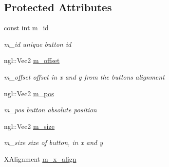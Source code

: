 \subsection*{Protected Attributes}
\begin{DoxyCompactItemize}
\item 
\hypertarget{class_button_a8d446cc1bff0dad800e74e151eaeaf38}{}const int \hyperlink{class_button_a8d446cc1bff0dad800e74e151eaeaf38}{m\+\_\+id}\label{class_button_a8d446cc1bff0dad800e74e151eaeaf38}

\begin{DoxyCompactList}\small\item\em m\+\_\+id unique button id \end{DoxyCompactList}\item 
\hypertarget{class_button_a20ef475ad8fec530edf763d329984a23}{}ngl\+::\+Vec2 \hyperlink{class_button_a20ef475ad8fec530edf763d329984a23}{m\+\_\+offset}\label{class_button_a20ef475ad8fec530edf763d329984a23}

\begin{DoxyCompactList}\small\item\em m\+\_\+offset offset in x and y from the button\textquotesingle{}s alignment \end{DoxyCompactList}\item 
\hypertarget{class_button_a69d3cbc6e82f975ed030b3e375c6c24c}{}ngl\+::\+Vec2 \hyperlink{class_button_a69d3cbc6e82f975ed030b3e375c6c24c}{m\+\_\+pos}\label{class_button_a69d3cbc6e82f975ed030b3e375c6c24c}

\begin{DoxyCompactList}\small\item\em m\+\_\+pos button absolute position \end{DoxyCompactList}\item 
\hypertarget{class_button_aeb2d26941560d1780bea586ad38d8393}{}ngl\+::\+Vec2 \hyperlink{class_button_aeb2d26941560d1780bea586ad38d8393}{m\+\_\+size}\label{class_button_aeb2d26941560d1780bea586ad38d8393}

\begin{DoxyCompactList}\small\item\em m\+\_\+size size of button, in x and y \end{DoxyCompactList}\item 
\hypertarget{class_button_a8fe3f35f9eebbbe83e809cb23dd2c7a6}{}X\+Alignment \hyperlink{class_button_a8fe3f35f9eebbbe83e809cb23dd2c7a6}{m\+\_\+x\+\_\+align}\label{class_button_a8fe3f35f9eebbbe83e809cb23dd2c7a6}


\end{DoxyCompactItemize}
